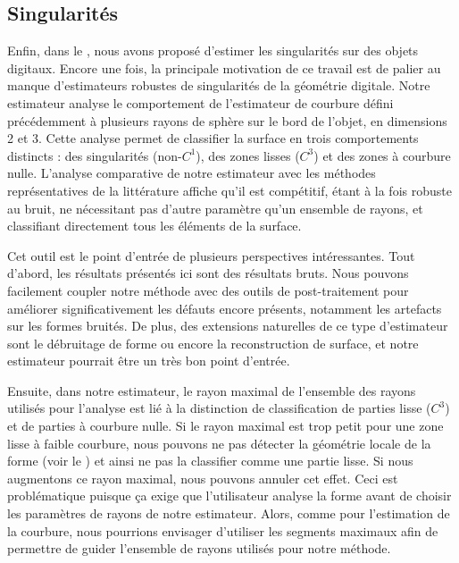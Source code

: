 \subsection*{Singularités}
%
Enfin, dans le , nous avons proposé d'estimer les
singularités sur des objets digitaux. Encore une fois, la principale motivation
de ce travail est de palier au manque d'estimateurs robustes de singularités de
la géométrie digitale. Notre estimateur analyse le comportement de l'estimateur
de courbure défini précédemment à plusieurs rayons de sphère sur le bord de
l'objet, en dimensions 2 et 3. Cette analyse permet de classifier la surface en
trois comportements distincts : des singularités (non-$C^1$), des zones lisses
($C^3$) et des zones à courbure nulle. L'analyse comparative de notre
estimateur avec les méthodes représentatives de la littérature affiche qu'il est compétitif, étant à la fois robuste au bruit, ne
nécessitant pas d'autre paramètre qu'un ensemble de rayons, et classifiant
directement tous les éléments de la surface.


Cet outil est le point d'entrée de plusieurs perspectives intéressantes. Tout
d'abord, les résultats présentés ici sont des résultats bruts. Nous pouvons
facilement coupler notre méthode avec des outils de post-traitement pour
améliorer significativement les défauts encore présents, notamment les artefacts
sur les formes bruités. De plus, des extensions naturelles de ce type
d'estimateur sont le débruitage de forme ou encore la reconstruction de surface,
et notre estimateur pourrait être un très bon point d'entrée.


Ensuite, dans notre estimateur, le rayon maximal de l'ensemble des rayons utilisés pour l'analyse est lié à la distinction de classification de parties
lisse ($C^3$) et de parties à courbure nulle. Si le rayon maximal est trop petit
pour une zone lisse à faible courbure, nous pouvons ne pas détecter la géométrie
locale de la forme (voir le ) et
ainsi ne pas la classifier comme une partie lisse. Si nous augmentons ce rayon
maximal, nous pouvons annuler cet effet. Ceci est problématique puisque ça
exige que l'utilisateur analyse la forme avant de choisir les paramètres de
rayons de notre estimateur. Alors, comme pour l'estimation de la courbure,
nous pourrions envisager d'utiliser les segments maximaux afin de permettre de guider l'ensemble de rayons utilisés
pour notre méthode.


